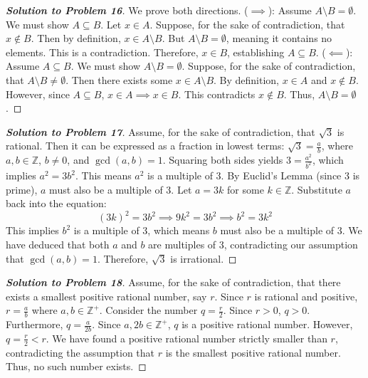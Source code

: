 \documentclass[11pt]{article}
\begin{document}
\begin{proof}[\textbf{Solution to Problem 16}]
We prove both directions.
($\implies$): Assume $A \setminus B = \emptyset$. We must show $A \subseteq B$. Let $x \in A$. Suppose, for the sake of contradiction, that $x \notin B$. Then by definition, $x \in A \setminus B$. But $A \setminus B = \emptyset$, meaning it contains no elements. This is a contradiction. Therefore, $x \in B$, establishing $A \subseteq B$.
($\impliedby$): Assume $A \subseteq B$. We must show $A \setminus B = \emptyset$. Suppose, for the sake of contradiction, that $A \setminus B \neq \emptyset$. Then there exists some $x \in A \setminus B$. By definition, $x \in A$ and $x \notin B$. However, since $A \subseteq B$, $x \in A \implies x \in B$. This contradicts $x \notin B$. Thus, $A \setminus B = \emptyset$.
\end{proof}

\begin{proof}[\textbf{Solution to Problem 17}]
Assume, for the sake of contradiction, that $\sqrt{3}$ is rational. Then it can be expressed as a fraction in lowest terms: $\sqrt{3} = \frac{a}{b}$, where $a, b \in \mathbb{Z}$, $b \neq 0$, and $\gcd(a, b) = 1$.
Squaring both sides yields $3 = \frac{a^2}{b^2}$, which implies $a^2 = 3b^2$.
This means $a^2$ is a multiple of 3. By Euclid's Lemma (since 3 is prime), $a$ must also be a multiple of 3. Let $a = 3k$ for some $k \in \mathbb{Z}$.
Substitute $a$ back into the equation:
\[ (3k)^2 = 3b^2 \implies 9k^2 = 3b^2 \implies b^2 = 3k^2 \]
This implies $b^2$ is a multiple of 3, which means $b$ must also be a multiple of 3.
We have deduced that both $a$ and $b$ are multiples of 3, contradicting our assumption that $\gcd(a, b) = 1$. Therefore, $\sqrt{3}$ is irrational.
\end{proof}

\begin{proof}[\textbf{Solution to Problem 18}]
Assume, for the sake of contradiction, that there exists a smallest positive rational number, say $r$.
Since $r$ is rational and positive, $r = \frac{a}{b}$ where $a, b \in \mathbb{Z}^+$.
Consider the number $q = \frac{r}{2}$. Since $r > 0$, $q > 0$.
Furthermore, $q = \frac{a}{2b}$. Since $a, 2b \in \mathbb{Z}^+$, $q$ is a positive rational number.
However, $q = \frac{r}{2} < r$. We have found a positive rational number strictly smaller than $r$, contradicting the assumption that $r$ is the smallest positive rational number. Thus, no such number exists.
\end{proof}
\end{document}
